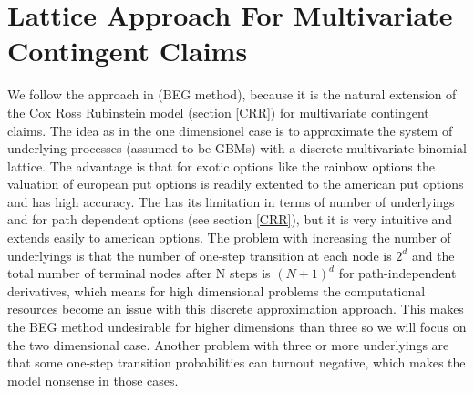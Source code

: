\section{Lattice Approach For Multivariate Contingent Claims}
We follow the approach in \parencite{BEG} (BEG method), because it is the natural extension of the Cox Ross Rubinstein model (section \ref{CRR}) for multivariate contingent claims. The idea as in the one dimensionel case is to approximate the system of underlying processes (assumed to be GBMs) with a discrete multivariate binomial lattice. The advantage is that for exotic options like the rainbow options the valuation of european put options is readily extented to the american put options and has high accuracy. The \parencite{BEG} has its limitation in terms of number of underlyings and for path dependent options (see section \ref{CRR}), but it is very intuitive and extends easily to american options. The problem with increasing the number of underlyings is that the number of one-step transition at each node is $2^d$ and the total number of terminal nodes after N steps is $(N+1)^d$ for path-independent derivatives, which means for high dimensional problems the computational resources become an issue with this discrete approximation approach. This makes the BEG method undesirable for higher dimensions than three so we will focus on the two dimensional case. Another problem with three or more underlyings are that some one-step transition probabilities can turnout negative, which makes the model nonsense in those cases. \\

